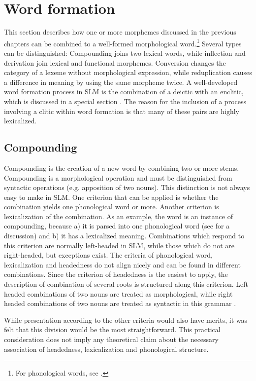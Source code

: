 \chapter{Word formation}\label{sec:form:WordFormation}
This section describes how one or more morphemes discussed in the previous chapters can be combined to a well-formed morphological word.\footnote{For phonological words, see .}
Several types can be distinguished: Compounding joins two lexical words, while inflection and derivation join lexical and functional morphemes. Conversion changes the category of a lexeme without morphological expression, while reduplication causes a difference in meaning by using the same morpheme twice.
A well-developed word formation process in SLM is the combination of a deictic with an enclitic, which is discussed in a special section . The reason for the inclusion of a process involving a clitic within word formation is that many of these pairs are highly lexicalized.

\section{Compounding}\label{sec:wofo:Compounding}
Compounding is the creation of a new word by combining two or more stems. Compounding is a morphological operation and must be distinguished from syntactic operations (e.g. apposition of two nouns). This distinction is not always easy to make in SLM. One criterion that can be applied is whether the combination yields one phonological word or more. Another criterion is lexicalization of the combination. As an example, the word  is an instance of compounding, because a) it is parsed into one phonological word (see  for a discussion) and b) it has a lexicalized meaning. Combinations which respond to this criterion are normally left-headed in SLM, while those which do not are right-headed, but exceptions exist. The criteria of phonological word, lexicalization and headedness do not align nicely and can be found in different combinations. Since the criterion of headedness is the easiest to apply, the description of combination of several roots is structured along this criterion. Left-headed combinations of two nouns are treated as morphological, while right headed combinations of two nouns are treated as syntactic in this grammar .

While presentation according to the other criteria would also have merits, it was felt that this division would be the most straightforward. This practical consideration does not imply any theoretical claim about the necessary association of headedness, lexicalization and phonological structure.

